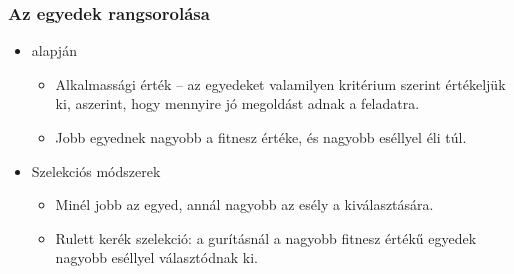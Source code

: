 \documentclass[../../main.tex]{subfiles}
\begin{document}
\subsubsection{Az egyedek rangsorolása}
\begin{itemize}
  \item {} alapján
        \begin{itemize}
          \item Alkalmassági érték --  az egyedeket valamilyen kritérium
                szerint értékeljük ki, aszerint, hogy mennyire jó megoldást
                adnak a feladatra.
          \item Jobb egyednek nagyobb a fitnesz értéke, és nagyobb eséllyel
                éli túl.
        \end{itemize}
  \item Szelekciós módszerek
        \begin{itemize}
          \item Minél jobb az egyed, annál nagyobb az esély a kiválasztására.
          \item Rulett kerék szelekció: a gurításnál a nagyobb fitnesz értékű
                egyedek nagyobb eséllyel választódnak ki.
        \end{itemize}
\end{itemize}
\end{document}
